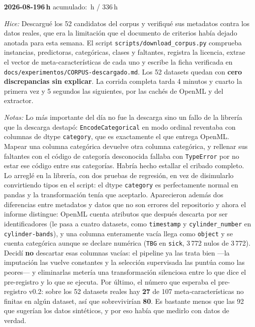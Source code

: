 \documentclass[11pt,letterpaper]{article}
\newcommand{\presupuesto}{336}
\newcommand{\horasacum}{0}
\newcommand{\entrada}[4]{%
  \xdef\horasacum{\fpeval{\horasacum + #2}}%
  \par\medskip
  \noindent\textbf{\color{tecnavy}#1}\quad\textbf{#2\,h}%
  \hfill{\small\color{gris}acumulado: \horasacum\,h / \presupuesto\,h}\par
  \nopagebreak
  \noindent\textit{Hice:} #3\par
  \nopagebreak
  \noindent\textit{Notas:} #4\par
}
\begin{document}
\entrada{2026-08-19}{6}
{Descargué los 52 candidatos del corpus y verifiqué sus metadatos contra los datos reales,
 que era la limitación que el documento de criterios había dejado anotada para esta semana.
 El script \texttt{scripts/download\_corpus.py} comprueba instancias, predictoras,
 categóricas, clases y faltantes, registra la licencia, extrae el vector de
 meta-características de cada uno y escribe la ficha verificada en
 \texttt{docs/experimentos/CORPUS-descargado.md}. Los 52 datasets quedan con
 \textbf{cero discrepancias sin explicar}. La corrida completa tarda 4 minutos y cuarto la
 primera vez y 5 segundos las siguientes, por las cachés de OpenML y del extractor.}
{Lo más importante del día no fue la descarga sino un fallo de la librería que la descarga
 destapó: \texttt{EncodeCategorical} en modo ordinal reventaba con columnas de dtype
 \texttt{category}, que es exactamente el que entrega OpenML. Mapear una columna categórica
 devuelve otra columna categórica, y rellenar sus faltantes con el código de categoría
 desconocida fallaba con \texttt{TypeError} por no estar ese código entre sus categorías.
 Habría hecho estallar el cribado completo. Lo arreglé en la librería, con dos pruebas de
 regresión, en vez de disimularlo convirtiendo tipos en el script: el dtype
 \texttt{category} es perfectamente normal en pandas y la transformación tenía que
 aceptarlo. Aparecieron además dos diferencias entre metadatos y datos que no son errores
 del repositorio y ahora el informe distingue: OpenML cuenta atributos que después descarta
 por ser identificadores (le pasa a cuatro datasets, como \texttt{timestamp} y
 \texttt{cylinder\_number} en \texttt{cylinder-bands}), y una columna enteramente vacía
 llega como \texttt{object} y se cuenta categórica aunque se declare numérica (\texttt{TBG}
 en \texttt{sick}, 3\,772 nulos de 3\,772). Decidí \textbf{no} descartar esas columnas
 vacías: el pipeline ya las trata bien —la imputación las vuelve constantes y la selección
 supervisada las puntúa como las peores— y eliminarlas metería una transformación
 silenciosa entre lo que dice el pre-registro y lo que se ejecuta. Por último, el número que
 esperaba el pre-registro v0.2: sobre los 52 datasets reales hay \textbf{27} de 107
 meta-características no finitas en algún dataset, así que sobrevivirían \textbf{80}. Es
 bastante menos que las 92 que sugerían los datos sintéticos, y por eso había que medirlo
 con datos de verdad.}
\end{document}
